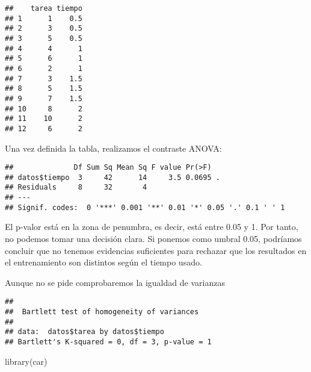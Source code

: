 \documentclass[
]{article}
\newenvironment{Shaded}{\begin{snugshade}}{\end{snugshade}}
\newcommand{\FunctionTok}[1]{\textcolor[rgb]{0.00,0.00,0.00}{#1}}
\newcommand{\NormalTok}[1]{#1}
\newcommand{\SpecialCharTok}[1]{\textcolor[rgb]{0.00,0.00,0.00}{#1}}
\begin{document}
\begin{verbatim}
##    tarea tiempo
## 1      1    0.5
## 2      3    0.5
## 3      5    0.5
## 4      4      1
## 5      6      1
## 6      2      1
## 7      3    1.5
## 8      5    1.5
## 9      7    1.5
## 10     8      2
## 11    10      2
## 12     6      2
\end{verbatim}

Una vez definida la tabla, realizamos el contraste ANOVA:

\begin{Shaded}
\end{Shaded}

\begin{verbatim}
##              Df Sum Sq Mean Sq F value Pr(>F)  
## datos$tiempo  3     42      14     3.5 0.0695 .
## Residuals     8     32       4                 
## ---
## Signif. codes:  0 '***' 0.001 '**' 0.01 '*' 0.05 '.' 0.1 ' ' 1
\end{verbatim}

El p-valor está en la zona de penumbra, es decir, está entre 0.05 y 1.
Por tanto, no podemos tomar una decisión clara. Si ponemos como umbral
0.05, podríamos concluir que no tenemos evidencias suficientes para
rechazar que los resultados en el entrenamiento son distintos según el
tiempo usado.

Aunque no se pide comprobaremos la igualdad de varianzas

\begin{Shaded}
\end{Shaded}

\begin{verbatim}
## 
##  Bartlett test of homogeneity of variances
## 
## data:  datos$tarea by datos$tiempo
## Bartlett's K-squared = 0, df = 3, p-value = 1
\end{verbatim}

\begin{Shaded}
\begin{Highlighting}[]
\FunctionTok{library}\NormalTok{(car)}
\end{Highlighting}
\end{Shaded}
\end{document}
